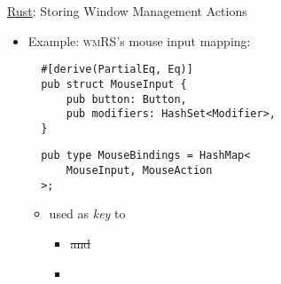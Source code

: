 \begin{frame}[fragile]{\underline{Rust}: Storing Window Management Actions \hfill {\footnotesize \currentname}}


    \begin{itemize}

        \item Example: \textsc{wmRS}'s mouse input mapping:\\[3pt]
\begin{verbatim}
  #[derive(PartialEq, Eq)]
  pub struct MouseInput {
      pub button: Button,
      pub modifiers: HashSet<Modifier>,
  }
\end{verbatim}
\begin{verbatim}
  pub type MouseBindings = HashMap<
      MouseInput, MouseAction
  >;
\end{verbatim}

    \vspace*{5pt}\begin{itemize}

        \item {} used as \textit{key} to 
            \begin{itemize}
                \item \sout<2->{ and } 
                \item<3->  
            \end{itemize}

    \end{itemize}

    \end{itemize}

    \vfill

\end{frame}

